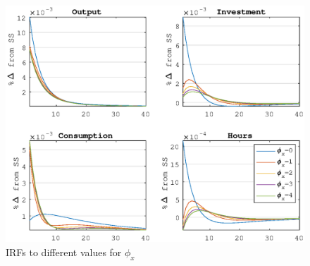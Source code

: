 \documentclass[thmsa,11pt,a4paper]{article}
\theoremstyle{definition}
\begin{document}
\begin{figure}[H]
\centering
  \includegraphics[width=0.8\linewidth]{IRFs}
  \caption{IRFs to different values for $\phi_x$}
  \label{thetay}
\end{figure}
\end{document}
